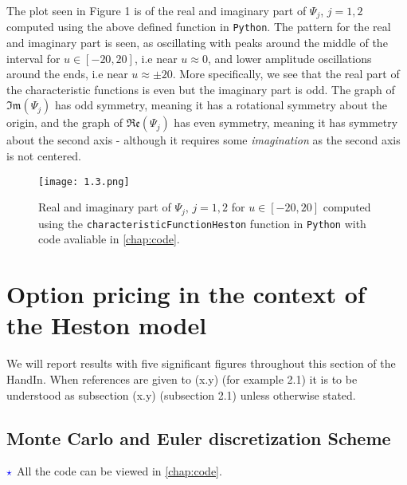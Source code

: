 \documentclass[12pt]{article}
\numberwithin{equation}{section}
\begin{document}
\newpage
The plot seen in Figure 1 is of the real and imaginary part of
$\Psi_j$, $j=1,2$ computed using the above defined function in \texttt{Python}.
The pattern for the real and imaginary part is seen, as oscillating with peaks
around the middle of the interval
for $u\in [-20,20]$, i.e near $u \approx 0$, and lower amplitude oscillations around the
ends, i.e near $u\approx \pm 20$. More specifically, we see that the real part
of the characteristic functions is even but the imaginary part is odd. The graph
of $\mathfrak{Im}(\Psi_j)$ has odd symmetry, meaning it has a rotational
symmetry about the origin, and the graph of $\mathfrak{Re}(\Psi_j)$ has even
symmetry, meaning it has symmetry about the second axis - although it requires
some \textit{imagination} as the second axis is not centered.
\begin{figure}[!h]
    \begin{adjustwidth}{-2cm}{-2cm}  %
      \centering
      \texttt{[image: 1.3.png]} %
      \label{Figure 1}
    \end{adjustwidth}
    \captionsetup{skip=-25pt} %
    \caption{Real and imaginary part of $\Psi_j$, $j=1,2$ for $u\in [-20,20]$
    computed using the \texttt{characteristicFunctionHeston} function in
    \texttt{Python} with code avaliable in \autoref{chap:code}.}
\end{figure}

\newpage
\section{Option pricing in the context of the Heston model}
We will report results with five significant figures throughout this section of
the HandIn. When references are given to (x.y) (for example 2.1) it is to be understood as
subsection (x.y) (subsection 2.1) unless otherwise stated.
\subsection{Monte Carlo and Euler discretization Scheme}
$\textcolor{blue}{\star}$ All the code can be viewed in \autoref{chap:code}.
\end{document}
